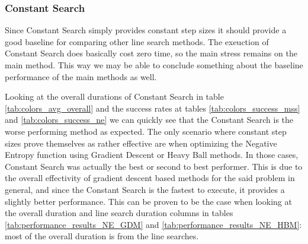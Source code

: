 \documentclass[a4paper,english,titlepage,12pt]{article}
\begin{document}

\subsubsection*{Constant Search}

Since Constant Search simply provides constant step sizes it should provide a good baseline for comparing other line search methods. The exeuction of Constant Search does basically cost zero time, so the main stress remains on the main method. This way we may be able to conclude something about the baseline performance of the main methods as well.

Looking at the overall durations of Constant Search in table \ref{tab:colors_avg_overall} and the success rates at tables \ref{tab:colors_success_mss} and \ref{tab:colors_success_ne} we can quickly see that the Constant Search is the worse performing method as expected. The only scenario where constant step sizes prove themselves as rather effective are when optimizing the Negative Entropy function using Gradient Descent or Heavy Ball methods. In those cases, Constant Search was actually the best or second to best performer. This is due to the overall effectivity of gradient descent based methods for the said problem in general, and since the Constant Search is the fastest to execute, it provides a slightly better performance. This can be proven to be the case when looking at the overall duration and line search duration columns in tables \ref{tab:performance_results_NE_GDM} and \ref{tab:performance_results_NE_HBM}: most of the overall duration is from the line searches.
\end{document}

